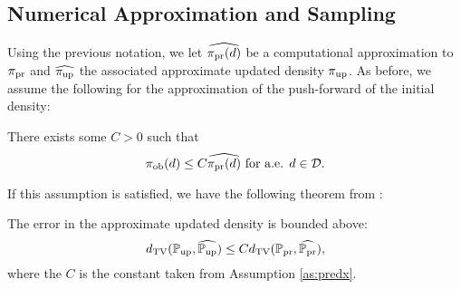 \subsection{Numerical Approximation and Sampling}\label{sec:approx}
%
%
%
%




Using the previous notation, we let $\widehat{\operatorname*{\pi_{pr}}(d)}$ be a computational approximation to $\operatorname*{\pi_{pr}}$ and $\widehat{\operatorname*{\pi_{up}}}$ the associated approximate updated density $\operatorname*{\pi_{up}}$.
As before, we assume the following for the approximation of the push-forward of the initial density:
\begin{assumption}\label{as:predx}
There exists some $C>0$ such that
\[
\operatorname*{\pi_{ob}} (d) \leq C \widehat{\operatorname*{\pi_{pr}}(d)} \text{ for a.e. } d\in \mathcal{D}.
\]
\end{assumption}

If this assumption is satisfied, we have the following theorem from \cite{BJW18}:
\begin{thm}
  The error in the approximate updated density is bounded above:
  \begin{equation}\label{eq:predicted_bound}
    d_{\text{TV}} (\operatorname*{\mathbb{P}_{up}}, \widehat{\operatorname*{\mathbb{P}_{up}}}) \leq C d_{\text{TV}} (\operatorname*{\mathbb{P}_{pr}}, \widehat{\operatorname*{\mathbb{P}_{pr}}}),
  \end{equation}
  where the $C$ is the constant taken from Assumption \ref{as:predx}. 
\end{thm}

